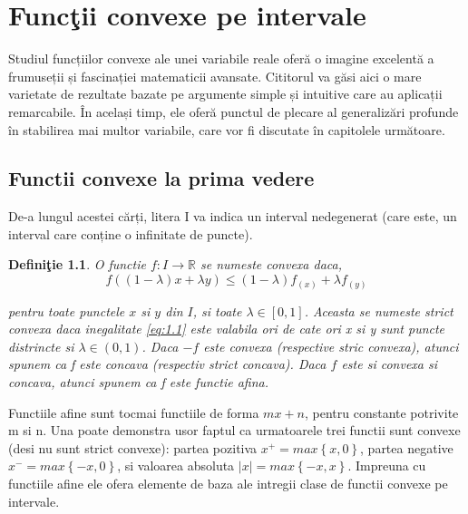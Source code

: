 \documentclass[a4paper,12pt,oneside]{report}
\newtheorem{definition}{Defini\c tie}
\begin{document}
\maketitle

\tableofcontents

%
%
%
%
\chapter{Func\c tii convexe pe intervale}

Studiul funcțiilor convexe ale unei variabile reale oferă o imagine excelentă a frumuseții și fascinației matematicii avansate. Cititorul va găsi aici o mare varietate de rezultate bazate pe argumente simple și intuitive care au aplicații remarcabile. În același timp, ele oferă punctul de plecare al generalizări profunde în stabilirea mai multor variabile, care vor fi discutate în capitolele următoare.

\section{Functii convexe la prima vedere}

De-a lungul acestei cărți, litera I va indica un interval nedegenerat (care este, un interval care conține o infinitate de puncte).

\begin{definition}

O functie \(f: I \rightarrow \mathbb{R}\) se numeste convexa daca,
\begin{displaymath}
f \left ( \left ( 1 - \lambda  \right )x + \lambda y \right )\leq \left ( 1 - \lambda  \right ) f_{\left ( x \right )} + \lambda f_{\left ( y \right )} 	\label{eq:1.1} \tag{1.1}
\end{displaymath}

pentru toate punctele \(x\) si \(y\) din \(I\), si toate \(\lambda \in \left [ 0,1 \right ]\). Aceasta se numeste strict convexa daca inegalitate \ref{eq:1.1} este valabila ori de cate ori x si y sunt puncte distrincte si \(\lambda \in \left ( 0,1 \right )\). Daca \(-f\)  este convexa (respective stric convexa), atunci spunem ca f  este concava (respectiv strict concava). Daca \(f\) este si convexa si concava, atunci spunem ca f  este functie afina. 
\end{definition}

Functiile afine sunt tocmai functiile de forma \(mx + n\), pentru constante potrivite m si n. Una poate demonstra usor faptul ca urmatoarele trei functii sunt convexe (desi nu sunt strict convexe): partea pozitiva \(x^{+} = max \left \{ x,0 \right \}\), partea negative \(x^{-} = max \left \{ -x,0 \right \}\), si valoarea absoluta \(\left | x \right | = max \left \{ -x,x \right \}\). Impreuna cu functiile afine ele ofera elemente de baza ale intregii clase de functii convexe pe intervale. 
\end{document}
